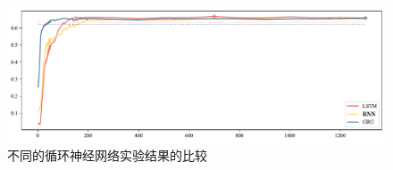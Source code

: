\begin{figure}[htb]
	\centering
	\includegraphics[width=0.75\linewidth]{images/循环结构.pdf}
	\caption{不同的循环神经网络实验结果的比较}
	\label{fig:structure}
\end{figure}